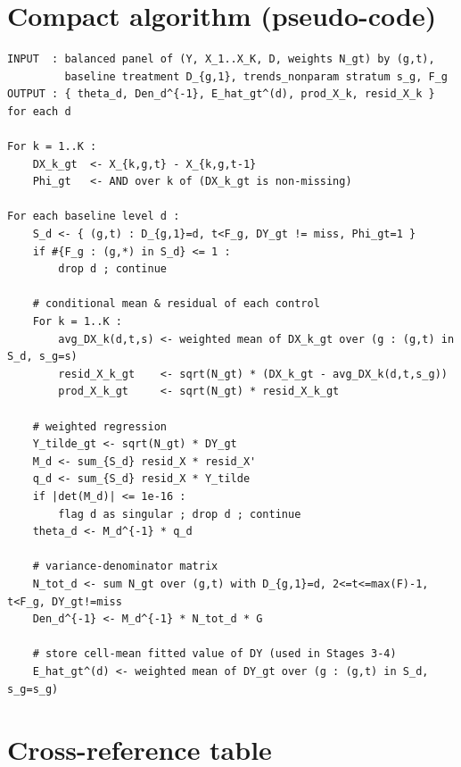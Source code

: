 \documentclass[11pt]{article}
\newcommand{\1}{\mathbb{1}}
\begin{document}
\section{Compact algorithm (pseudo-code)}

\begin{lstlisting}
INPUT  : balanced panel of (Y, X_1..X_K, D, weights N_gt) by (g,t),
         baseline treatment D_{g,1}, trends_nonparam stratum s_g, F_g
OUTPUT : { theta_d, Den_d^{-1}, E_hat_gt^(d), prod_X_k, resid_X_k } for each d

For k = 1..K :
    DX_k_gt  <- X_{k,g,t} - X_{k,g,t-1}
    Phi_gt   <- AND over k of (DX_k_gt is non-missing)

For each baseline level d :
    S_d <- { (g,t) : D_{g,1}=d, t<F_g, DY_gt != miss, Phi_gt=1 }
    if #{F_g : (g,*) in S_d} <= 1 :
        drop d ; continue

    # conditional mean & residual of each control
    For k = 1..K :
        avg_DX_k(d,t,s) <- weighted mean of DX_k_gt over (g : (g,t) in S_d, s_g=s)
        resid_X_k_gt    <- sqrt(N_gt) * (DX_k_gt - avg_DX_k(d,t,s_g))
        prod_X_k_gt     <- sqrt(N_gt) * resid_X_k_gt

    # weighted regression
    Y_tilde_gt <- sqrt(N_gt) * DY_gt
    M_d <- sum_{S_d} resid_X * resid_X'
    q_d <- sum_{S_d} resid_X * Y_tilde
    if |det(M_d)| <= 1e-16 :
        flag d as singular ; drop d ; continue
    theta_d <- M_d^{-1} * q_d

    # variance-denominator matrix
    N_tot_d <- sum N_gt over (g,t) with D_{g,1}=d, 2<=t<=max(F)-1, t<F_g, DY_gt!=miss
    Den_d^{-1} <- M_d^{-1} * N_tot_d * G

    # store cell-mean fitted value of DY (used in Stages 3-4)
    E_hat_gt^(d) <- weighted mean of DY_gt over (g : (g,t) in S_d, s_g=s_g)
\end{lstlisting}

\section{Cross-reference table}
\end{document}
